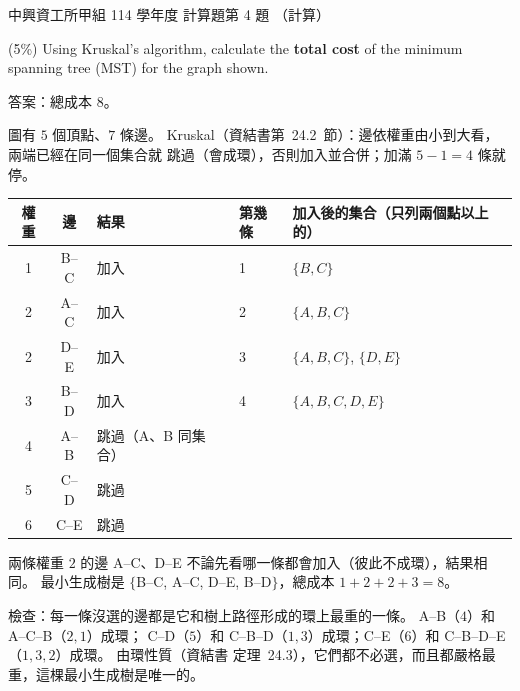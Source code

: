 \begin{pastexam}[label={px:nchu-114-dsa-24}]{中興資工所甲組 114 學年度 計算題第 4 題}
（計算）

(5\%) Using Kruskal's algorithm, calculate the \textbf{total cost} of the minimum spanning tree (MST) for the graph shown.

\begin{center}
\end{center}
\end{pastexam}

\begin{pastsoln}
答案：總成本 $8$。

圖有 $5$ 個頂點、$7$ 條邊。 Kruskal（資結書第~24.2~節）：邊依權重由小到大看，兩端已經在同一個集合就
跳過（會成環），否則加入並合併；加滿 $5 - 1 = 4$ 條就停。
\begin{center}
\begin{tabular}{cclll}
\toprule
權重 & 邊 & 結果 & 第幾條 & 加入後的集合（只列兩個點以上的） \\
\midrule
1 & B--C & 加入 & 1 & $\{B, C\}$ \\
2 & A--C & 加入 & 2 & $\{A, B, C\}$ \\
2 & D--E & 加入 & 3 & $\{A, B, C\}$, $\{D, E\}$ \\
3 & B--D & 加入 & 4 & $\{A, B, C, D, E\}$ \\
4 & A--B & 跳過（A、B 同集合） & & \\
5 & C--D & 跳過 & & \\
6 & C--E & 跳過 & & \\
\bottomrule
\end{tabular}
\end{center}
兩條權重 $2$ 的邊 A--C、D--E 不論先看哪一條都會加入（彼此不成環），結果相同。 最小生成樹是
$\{$B--C, A--C, D--E, B--D$\}$，總成本 $1 + 2 + 2 + 3 = 8$。

檢查：每一條沒選的邊都是它和樹上路徑形成的環上最重的一條。 A--B（$4$）和 A--C--B（$2, 1$）成環；
C--D（$5$）和 C--B--D（$1, 3$）成環；C--E（$6$）和 C--B--D--E（$1, 3, 2$）成環。 由環性質（資結書
定理~24.3），它們都不必選，而且都嚴格最重，這棵最小生成樹是唯一的。
\end{pastsoln}
